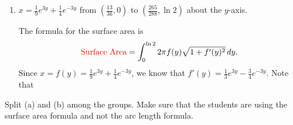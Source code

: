 \documentclass[]{ximera}
\begin{document}
\begin{problem}
\begin{enumerate}
		\item  $x = \frac{1}{9} e^{3y} + \frac{1}{4} e^{-3y}$ from $\left( \frac{13}{36}, 0 \right)$ to $\left( \frac{265}{288}, \ln 2 \right)$ about the $y$-axis.
		\begin{freeResponse}
		The formula for the surface area is
			\[
			\text{{\color{red} Surface Area}} = \int_0^{\ln 2} 2 \pi f(y) \sqrt{1+f'(y)^2} \,d y.
			\]
		Since $x = f(y) = \frac{1}{9} e^{3y} + \frac{1}{4} e^{-3y}$, 
		we know that $f'(y) = \frac{1}{3} e^{3y} - \frac{3}{4} e^{-3y}$.  
		Note that
		\end{freeResponse}
		
	\end{enumerate}
	
\end{problem}

\begin{instructorNotes}
Split (a) and (b) among the groups.  
Make sure that the students are using the surface area formula and not the arc length formula.
\end{instructorNotes}







\begin{problem}

	\begin{freeResponse}
	
	\end{freeResponse}
		
\end{problem}

\begin{instructorNotes}

\end{instructorNotes}







\begin{problem}

	\begin{freeResponse}
	
	\end{freeResponse}

\end{problem}

\begin{instructorNotes}

\end{instructorNotes}
















	
	
	
	
	
	
	
	
	

	










								
				
				
	
\end{document}
